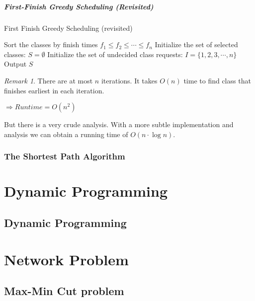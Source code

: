 \documentclass[11pt, a4paper, oneside]{book}
\theoremstyle{theoremdd}
\theoremstyle{remark}
\newtheorem*{remark}{Remark}
\begin{document}
\subsubsection*{First-Finish Greedy Scheduling (Revisited)}
\begin{algorithm}[H]
\SetAlgoLined
{}
\caption{First Finish Greedy Scheduling (revisited)}
Sort the classes by finish times $f_{1}\leq f_{2}\leq \cdots \leq f_{n}$\;
Initialize the set of selected classes: $S=\emptyset$\;
Initialize the set of undecided class requests: $I=\{1,2,3,\cdots,n\}$\;
Output $S$\;
\end{algorithm}
\begin{remark}
There are at most $n$ iterations. It takes $O(n)$ time to find class that finishes earliest in each iteration. 
\begin{center}
$\Rightarrow Runtime = O(n^2)$
\end{center}
But there is a very crude analysis. With a more subtle implementation and analysis we can obtain a running time of $O(n\cdot \log n)$.
\end{remark}

\section{The Shortest Path Algorithm}



\part{Dynamic Programming}
\chapter{Dynamic Programming}

\part{Network Problem}
\chapter{Max-Min Cut problem}
\end{document}
